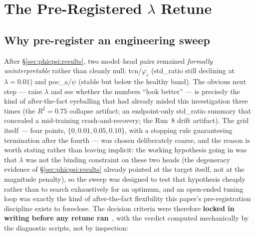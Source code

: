 \documentclass[11pt]{article}
\begin{document}
\section{The Pre-Registered $\lambda$ Retune}
\label{sec:phicpsi:prereg}

\subsection{Why pre-register an engineering sweep}
\label{subsec:why-pre-register-an-engineering-sweep}

After \S\ref{sec:phicpsi:results}, two model--head pairs remained \emph{formally uninterpretable} rather than cleanly null: tcn/$\varphi_c$ (std\_ratio still declining at $\lambda = 0.01$) and poc\_a/$\psi$ (stable but below the healthy band).
The obvious next step --- raise $\lambda$ and see whether the numbers ``look better'' --- is precisely the kind of after-the-fact eyeballing that had already misled this investigation three times (the $R^2 = 0.75$ collapse artifact; an endpoint-only std\_ratio summary that concealed a mid-training crash-and-recovery; the Run~8 drift artifact).
The grid itself --- four points, $\{0, 0.01, 0.05, 0.10\}$, with a stopping rule guaranteeing termination after the fourth --- was chosen deliberately coarse, and the reason is worth stating rather than leaving implicit: the working hypothesis going in was that $\lambda$ was not the binding constraint on these two heads (the degeneracy evidence of \S\ref{sec:phicpsi:results} already pointed at the target itself, not at the magnitude penalty), so the sweep was designed to test that hypothesis cheaply rather than to search exhaustively for an optimum, and an open-ended tuning loop was exactly the kind of after-the-fact flexibility this paper's pre-registration discipline exists to foreclose.
The decision criteria were therefore \textbf{locked in writing before any retune ran}~\citep{nosek2018preregistration}, with the verdict computed mechanically by the diagnostic scripts, not by inspection:
\end{document}
